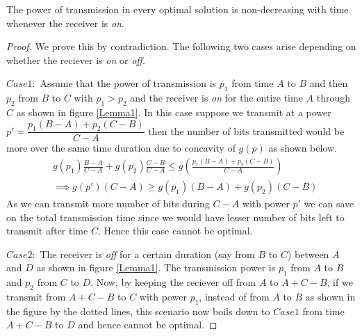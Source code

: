 \begin{lemma}
The power of transmission in every optimal solution is non-decreasing with time whenever the receiver is \textit{on}.
\label{lemma_increasing_power}
\end{lemma}
\begin{proof}
We prove this by contradiction. The following two cases arise depending on whether the reciever is \textit{on} or \textit{off}.

$Case 1:$ Assume that the power of transmission is $p_1$ from time $A$ to $B$ and then $p_2$ from $B$ to $C$ with $p_1>p_2$ and the receiver is \textit{on} for the entire time $A$ through $C$ as shown in figure \ref{Lemma1}. In this case suppose we transmit at a power $p'=\dfrac{p_1(B-A)+p_2(C-B)}{C-A}$ then the number of bits transmitted would be more over the same time duration due to concavity of $g(p)$ as shown below.
\begin{align}
&g(p_1)\frac{B-A}{C-A}+g(p_2)\frac{C-B}{C-A} \le g(\frac{p_1(B-A)+p_2(C-B)}{C-A})
\\
&\implies g(p')(C-A)\ge g(p_1)(B-A)+g(p_2)(C-B)  
\end{align}
As we can transmit more number of bits during $C-A$ with power $p'$ we can save on the total transmission time since we would have lesser number of bits left to transmit after time $C$. Hence this case cannot be optimal.

$Case 2:$ The receiver is \textit{off} for a certain duration (say from $B$ to $C$) between $A$ and $D$ as shown in figure \ref{Lemma1}. The transmission power is $p_1$ from $A$ to $B$ and $p_2$ from $C$ to $D$. Now, by keeping the reciever off from $A$ to $A+C-B$, if we transmit from $A+C-B$ to $C$ with power $p_1$, instead of from $A$ to $B$ as shown in the figure by the dotted lines, this scenario now boils down to $Case 1$ from time $A+C-B$ to $D$ and hence cannot be optimal.
\end{proof}


